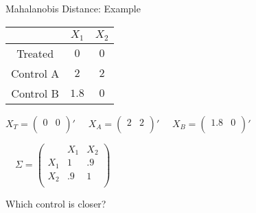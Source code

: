 \documentclass{beamer}
\numberwithin{equation}{section}
\begin{document}
\begin{frame}{Mahalanobis Distance: Example}

\begin{table}[!h]
 \begin{center}
 \begin{tabular}{ccc}
\multicolumn{1}{l}{}&
\multicolumn{1}{c}{$X_1$}&
\multicolumn{1}{c}{$X_2$}
\\ \hline
Treated &$0$&$  0$\\
Control A &$ 2$&$2$\\
Control B &$ 1.8$&$0$\\
\hline
\end{tabular}
\end{center}
\end{table}

$X_T=\left(        \begin{array}{cc}          0 & 0 \\        \end{array}      \right)' $
$\quad X_A=\left(                 \begin{array}{cc}                   2 & 2 \\                 \end{array}               \right)' $
$\quad X_B=\left(                 \begin{array}{cc}                   1.8 &  0 \\                 \end{array}               \right)' $\\\bigskip

$\quad\Sigma=\left(                \begin{array}{ccc}                   & X_1 & X_2 \\                  X_1 & 1 &  .9 \\                  X_2 & .9 & 1\\                \end{array}              \right)$\\\bigskip

Which control is closer?

\end{frame}
\end{document}
